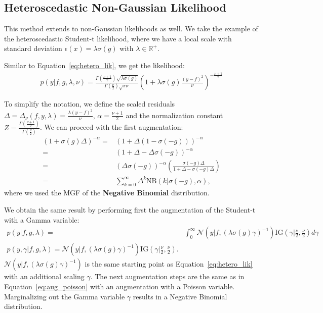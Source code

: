\subsection{Heteroscedastic Non-Gaussian Likelihood}
\label{sec:heteroscedastic_nongaussian}
This method extends to non-Gaussian likelihoods as well.
We take the example of the heteroscedastic Student-t likelihood, where we have a local scale with standard deviation $\epsilon(x) = \lambda \sigma(g)$ with $\lambda \in \mathbb{R}^+$.

Similar to Equation~\eqref{eq:hetero_lik}, we get the likelihood:
\begin{align}
    p(y|f,g,\lambda,\nu) = \frac{\Gamma(\frac{\nu+1}{2})\sqrt{\lambda\sigma(g)}}{\Gamma(\frac{\nu}{2})\sqrt{\pi\nu}}\left(1 + \lambda \sigma(g)\frac{(y-f)^2}{\nu}\right)^{-\frac{\nu+1}{2}}
    \label{eq:hetero_studentt}
\end{align}

To simplify the notation, we define the scaled residuals $\Delta=\Delta_\nu(f,y,\lambda) = \frac{\lambda(y-f)^2}{\nu}$, $\alpha =\frac{\nu+1}{2}$ and the normalization constant $Z = \frac{\Gamma(\frac{\nu+1}{2})}{\Gamma(\frac{\nu}{2})}$.
We can proceed with the first augmentation:
\begin{align}
    (1 + \sigma(g)\Delta)^{-\alpha} =& (1 + \Delta(1 - \sigma(-g)))^{-\alpha}\nonumber\\
    =&(1 + \Delta - \Delta\sigma(-g))^{-\alpha}\nonumber\\
    =& (\Delta\sigma(-g))^{-\alpha}\left(\frac{\sigma(-g)\Delta}{1 + \Delta -\sigma(-g)\Delta}\right)\nonumber\\
    =&\sum_{k=0}^{\infty} \Delta^k \mathrm{NB}(k|\sigma(-g),\alpha),\label{eq:negativebinomial}
\end{align}
where we used the \ac{MGF} of the \textbf{Negative Binomial} distribution.

We obtain the same result by performing first the augmentation of the Student-t with a Gamma variable:
\begin{align}
    p(y|f,g,\lambda) =& \int_0^\infty \mathcal{N}(y| f, (\lambda\sigma(g)\gamma)^{-1})\mathrm{IG}(\gamma|\frac{\nu}{2},\frac{\nu}{2})d\gamma\nonumber\\
    p(y,\gamma|f,g,\lambda)= \mathcal{N}(y| f, (\lambda\sigma(g)\gamma)^{-1})\mathrm{IG}(\gamma|\frac{\nu}{2},\frac{\nu}{2}).\label{eq:aug_gamma_studentt}
\end{align}
$\mathcal{N}(y| f, (\lambda\sigma(g)\gamma)^{-1})$ is the same starting point as Equation~\eqref{eq:hetero_lik} with an additional scaling $\gamma$.
The next augmentation steps are the same as in Equation~\eqref{eq:aug_poisson} with an augmentation with a Poisson variable.
Marginalizing out the Gamma variable $\gamma$ results in a Negative Binomial distribution.

